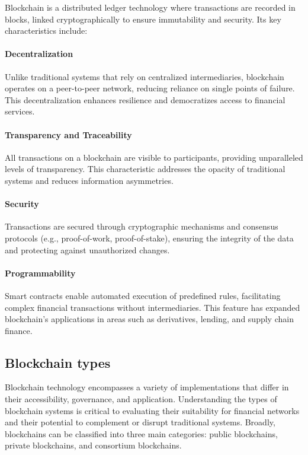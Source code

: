 Blockchain is a distributed ledger technology where transactions are recorded in blocks, linked cryptographically to ensure immutability and security. Its key characteristics include:

\paragraph{Decentralization}
Unlike traditional systems that rely on centralized intermediaries, blockchain operates on a peer-to-peer network, reducing reliance on single points of failure. This decentralization enhances resilience and democratizes access to financial services. \cite{morhaim_blockchain_2019}

\paragraph{Transparency and Traceability}
All transactions on a blockchain are visible to participants, providing unparalleled levels of transparency. This characteristic addresses the opacity of traditional systems and reduces information asymmetries. \cite{nakamoto_bitcoin_2008}

\paragraph{Security}
Transactions are secured through cryptographic mechanisms and consensus protocols (e.g., proof-of-work, proof-of-stake), ensuring the integrity of the data and protecting against unauthorized changes. \cite{iyengar_economics_2023}

\paragraph{Programmability}
Smart contracts enable automated execution of predefined rules, facilitating complex financial transactions without intermediaries. This feature has expanded blockchain's applications in areas such as derivatives, lending, and supply chain finance. \cite{morhaim_blockchain_2019} \\ 


\subsection{Blockchain types}

Blockchain technology encompasses a variety of implementations that differ in their accessibility, governance, and application. Understanding the types of blockchain systems is critical to evaluating their suitability for financial networks and their potential to complement or disrupt traditional systems. Broadly, blockchains can be classified into three main categories: public blockchains, private blockchains, and consortium blockchains.

